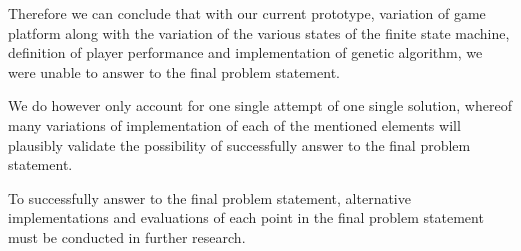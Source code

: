 Therefore we can conclude that with our current prototype, variation of game platform along with the variation of the various states of the finite state machine, definition of player performance and implementation of genetic algorithm, we were unable to answer to the final problem statement.

We do however only account for one single attempt of one single solution, whereof many variations of implementation of each of the mentioned elements will plausibly validate the possibility of successfully answer to the final problem statement.

To successfully answer to the final problem statement, alternative implementations and evaluations of each point in the final problem statement must be conducted in further research.

